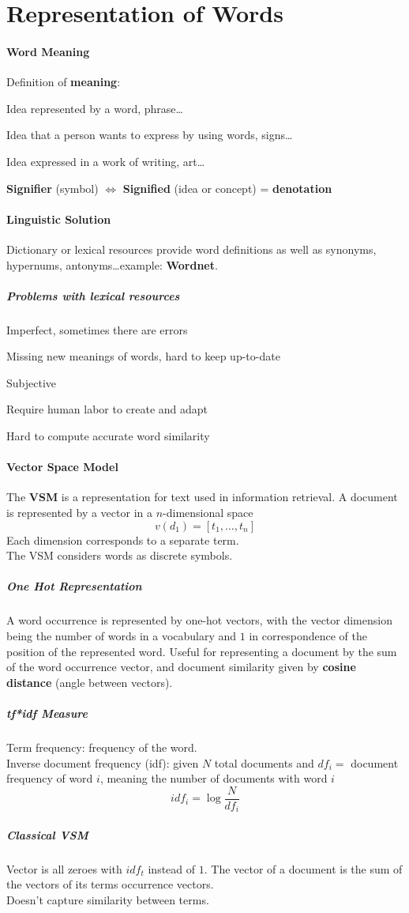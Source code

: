\documentclass[10pt]{report}
\begin{document}
\section{Representation of Words}
\paragraph{Word Meaning} Definition of \textbf{meaning}:\begin{list}{}{}
	\item Idea represented by a word, phrase\ldots
	\item Idea that a person wants to express by using words, signs\ldots
	\item Idea expressed in a work of writing, art\ldots
\end{list}
\textbf{Signifier} (symbol) $\Leftrightarrow$ \textbf{Signified} (idea or concept) = \textbf{denotation}
\paragraph{Linguistic Solution} Dictionary or lexical resources provide word definitions as well as synonyms, hypernums, antonyms\ldots example: \textbf{Wordnet}.
\subparagraph{Problems with lexical resources} \begin{list}{}{}
	\item Imperfect, sometimes there are errors
	\item Missing new meanings of words, hard to keep up-to-date
	\item Subjective
	\item Require human labor to create and adapt
	\item Hard to compute accurate word similarity
\end{list}
\paragraph{Vector Space Model} The \textbf{VSM} is a representation for text used in information retrieval. A document is represented by a vector in a $n$-dimensional space $$v(d_1) = [t_1,\ldots, t_n]$$
Each dimension corresponds to a separate term.\\
The VSM considers words as discrete symbols.
\subparagraph{One Hot Representation} A word occurrence is represented by one-hot vectors, with the vector dimension being the number of words in a vocabulary and $1$ in correspondence of the position of the represented word. Useful for representing a document by the sum of the word occurrence vector, and document similarity given by \textbf{cosine distance} (angle between vectors).
\subparagraph{tf*idf Measure} Term frequency: frequency of the word.\\
Inverse document frequency (idf): given $N$ total documents and $df_i=$ document frequency of word $i$, meaning the number of documents with word $i$
$$idf_i=\log\frac{N}{df_i}$$
\subparagraph{Classical VSM} Vector is all zeroes with $idf_t$ instead of $1$. The vector of a document is the sum of the vectors of its terms occurrence vectors.\\
Doesn't capture similarity between terms.
\end{document}
